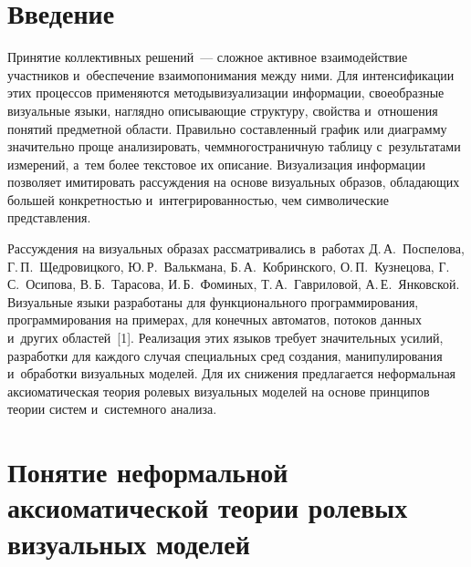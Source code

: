 



\thispagestyle{headings}

\begin{multicols}{2}

\label{st\stat}
  
\section{Введение}

  Принятие коллективных решений~--- сложное активное взаимодействие 
участников и~обеспечение взаимопонимания между ними. Для интенсификации 
этих процессов применяются методы\linebreak визуализации информации, своеобразные 
визуальные языки, наглядно описывающие структуру, свойства и~отношения 
понятий предметной об\-ласти. Правильно составленный график или диаграмму 
значительно проще анализировать, чем\linebreak мно\-го\-стра\-нич\-ную таблицу 
с~результатами измерений, а~тем более текстовое их описание. Визуализация 
информации позволяет имитировать рассужде\-ния на основе визуальных 
образов, обладающих большей конкретностью и~интегрированностью, чем 
символические представления. 
  
  Рассуждения на визуальных образах рас\-смат\-ри\-ва\-лись в~работах 
Д.\,А.~Поспелова, Г.\,П.~Щед\-ро\-виц\-ко\-го, Ю.\,Р.~Валькмана, 
Б.\,А.~Кобринского, О.\,П.~Кузнецова, Г.\,С.~Осипова, В.\,Б.~Тарасова, 
И.\,Б.~Фоминых, Т.\,А.~Гавриловой, А.\,Е.~Янковской. Визуальные языки 
разработаны для функционального программирования, программирования на 
примерах, для конечных автоматов, потоков данных и~других областей~[1]. 
Реализация этих языков требует значительных усилий, разработки для каждого 
случая специальных сред создания, манипулирования и~обработки визуальных 
моделей. Для их снижения предлагается неформальная аксиоматическая тео\-рия 
ролевых визуальных моделей на основе принципов тео\-рии сис\-тем и~сис\-тем\-но\-го 
анализа. 

\vspace*{-6pt}
  
\section{Понятие неформальной аксиоматической теории ролевых 
визуальных моделей}
  

\end{multicols}
